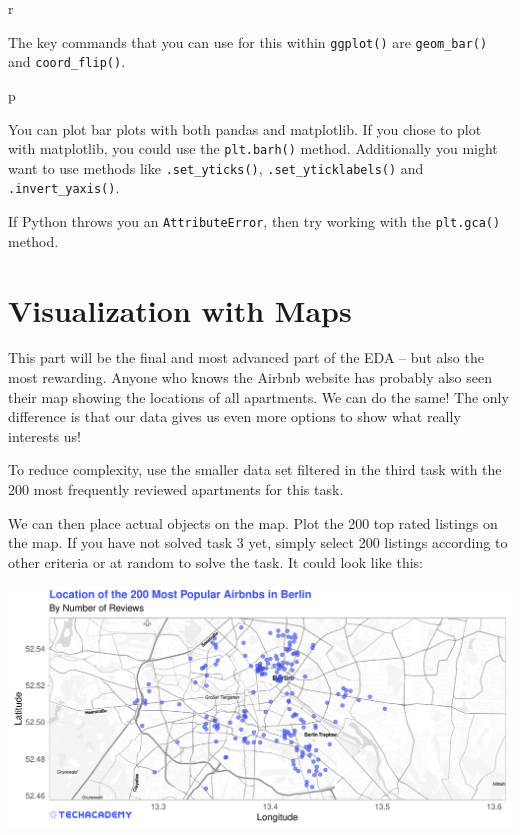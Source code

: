 \documentclass[
  11pt,
]{book}
\begin{document}
\begin{tips}r

The key commands that you can use for this within \texttt{ggplot()} are
\texttt{geom\_bar()} and \texttt{coord\_flip()}.

\end{tips}

\begin{tipsp}p

You can plot bar plots with both pandas and matplotlib. If you chose to
plot with matplotlib, you could use the \texttt{plt.barh()} method.
Additionally you might want to use methods like \texttt{.set\_yticks()},
\texttt{.set\_yticklabels()} and \texttt{.invert\_yaxis()}.

If Python throws you an \texttt{AttributeError}, then try working with
the \texttt{plt.gca()} method.

\end{tipsp}

\hypertarget{visualization-with-maps}{%
\section{Visualization with Maps}\label{visualization-with-maps}}

This part will be the final and most advanced part of the EDA -- but
also the most rewarding. Anyone who knows the Airbnb website has
probably also seen their map showing the locations of all apartments. We
can do the same! The only difference is that our data gives us even more
options to show what really interests us!

To reduce complexity, use the smaller data set filtered in the third
task with the 200 most frequently reviewed apartments for this task.

We can then place actual objects on the map. Plot the 200 top rated
listings on the map. If you have not solved task 3 yet, simply select
200 listings according to other criteria or at random to solve the task.
It could look like this:

\begin{center}\includegraphics[width=1\linewidth]{plot/4_1_map_top200_simple} \end{center}
\end{document}
